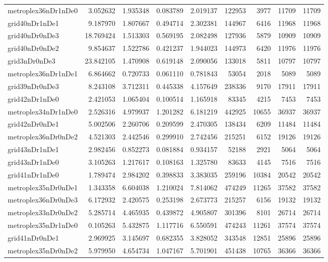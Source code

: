 \begin{longtable}{|l|r|r|r|r|r|r|r|r|}
metroplex36nDr1nDe0 & 3.052632 & 1.935348 & 0.083789 & 2.019137 & 122953 & 3977 & 11709 & 11709 \\
grid40nDr1nDe1 & 9.187970 & 1.807667 & 0.494714 & 2.302381 & 144967 & 6416 & 11968 & 11968 \\
grid40nDr0nDe3 & 18.769424 & 1.513303 & 0.569195 & 2.082498 & 127936 & 5879 & 10909 & 10909 \\
grid40nDr0nDe2 & 9.854637 & 1.522786 & 0.421237 & 1.944023 & 144973 & 6420 & 11976 & 11976 \\
grid3nDr0nDe3 & 23.842105 & 1.470908 & 0.619148 & 2.090056 & 133018 & 5811 & 10797 & 10797 \\
metroplex36nDr1nDe1 & 6.864662 & 0.720733 & 0.061110 & 0.781843 & 53054 & 2018 & 5089 & 5089 \\
grid39nDr0nDe3 & 8.243108 & 3.712311 & 0.445338 & 4.157649 & 238336 & 9170 & 17911 & 17911 \\
grid42nDr1nDe0 & 2.421053 & 1.065404 & 0.100514 & 1.165918 & 83345 & 4215 & 7453 & 7453 \\
metroplex34nDr1nDe0 & 2.526316 & 4.979937 & 1.201282 & 6.181219 & 442925 & 10655 & 36937 & 36937 \\
grid42nDr0nDe1 & 5.002506 & 2.260706 & 0.209599 & 2.470305 & 138434 & 6209 & 11484 & 11484 \\
metroplex36nDr0nDe2 & 4.521303 & 2.442546 & 0.299910 & 2.742456 & 215251 & 6152 & 19126 & 19126 \\
grid43nDr1nDe1 & 2.982456 & 0.852273 & 0.081884 & 0.934157 & 52188 & 2921 & 5064 & 5064 \\
grid43nDr1nDe0 & 3.105263 & 1.217617 & 0.108163 & 1.325780 & 83633 & 4145 & 7516 & 7516 \\
grid41nDr1nDe0 & 1.789474 & 2.984202 & 0.398833 & 3.383035 & 259196 & 10384 & 20542 & 20542 \\
metroplex35nDr0nDe1 & 1.343358 & 6.604038 & 1.210024 & 7.814062 & 474249 & 11265 & 37582 & 37582 \\
metroplex36nDr0nDe3 & 6.172932 & 2.420575 & 0.253198 & 2.673773 & 215257 & 6156 & 19132 & 19132 \\
metroplex33nDr0nDe2 & 5.285714 & 4.465935 & 0.439872 & 4.905807 & 301396 & 8101 & 26714 & 26714 \\
metroplex35nDr1nDe0 & 0.105263 & 5.432875 & 1.117716 & 6.550591 & 474243 & 11261 & 37574 & 37574 \\
grid41nDr0nDe1 & 2.969925 & 3.145697 & 0.682355 & 3.828052 & 343548 & 12851 & 25896 & 25896 \\
metroplex35nDr0nDe2 & 5.979950 & 4.654734 & 1.047167 & 5.701901 & 451438 & 10765 & 36366 & 36366 \\

\end{longtable}
